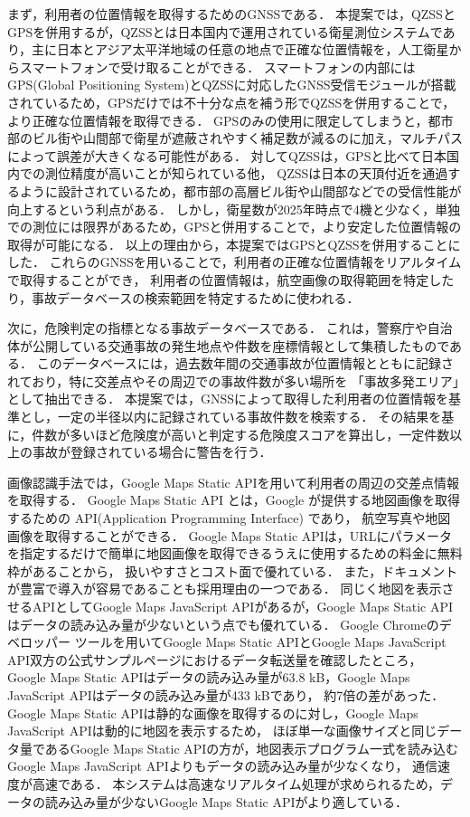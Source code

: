 \documentclass[uplatex,dvipdfmx]{jsarticle}
\begin{document}
まず，利用者の位置情報を取得するためのGNSSである．
本提案では，QZSSとGPSを併用するが，QZSSとは日本国内で運用されている衛星測位システムであり，主に日本とアジア太平洋地域の任意の地点で正確な位置情報を，人工衛星からスマートフォンで受け取ることができる．
スマートフォンの内部にはGPS(Global Positioning System)とQZSSに対応したGNSS受信モジュールが搭載されているため，GPSだけでは不十分な点を補う形でQZSSを併用することで，より正確な位置情報を取得できる．
GPSのみの使用に限定してしまうと，都市部のビル街や山間部で衛星が遮蔽されやすく補足数が減るのに加え，マルチパスによって誤差が大きくなる可能性がある．
対してQZSSは，GPSと比べて日本国内での測位精度が高いことが知られている他，
QZSSは日本の天頂付近を通過するように設計されているため，都市部の高層ビル街や山間部などでの受信性能が向上するという利点がある\cite{ref:qzss}．
しかし，衛星数が2025年時点で4機と少なく，単独での測位には限界があるため，GPSと併用することで，より安定した位置情報の取得が可能になる．
以上の理由から，本提案ではGPSとQZSSを併用することにした．
これらのGNSSを用いることで，利用者の正確な位置情報をリアルタイムで取得することができ，
利用者の位置情報は，航空画像の取得範囲を特定したり，事故データベースの検索範囲を特定するために使われる．

次に，危険判定の指標となる事故データベースである．
これは，警察庁や自治体が公開している交通事故の発生地点や件数を座標情報として集積したものである．
このデータベースには，過去数年間の交通事故が位置情報とともに記録されており，特に交差点やその周辺での事故件数が多い場所を
「事故多発エリア」として抽出できる．
本提案では，GNSSによって取得した利用者の位置情報を基準とし，一定の半径以内に記録されている事故件数を検索する．
その結果を基に，件数が多いほど危険度が高いと判定する危険度スコアを算出し，一定件数以上の事故が登録されている場合に警告を行う．

画像認識手法では，Google Maps Static APIを用いて利用者の周辺の交差点情報を取得する．
Google Maps Static API とは，Google が提供する地図画像を取得するための API(Application Programming Interface) であり，
航空写真や地図画像を取得することができる．
Google Maps Static APIは，URLにパラメータを指定するだけで簡単に地図画像を取得できるうえに使用するための料金に無料枠があることから，
扱いやすさとコスト面で優れている．
また，ドキュメントが豊富で導入が容易であることも採用理由の一つである．
同じく地図を表示させるAPIとしてGoogle Maps JavaScript APIがあるが，Google Maps Static APIはデータの読み込み量が少ないという点でも優れている．
Google Chromeのデベロッパー ツールを用いてGoogle Maps Static APIとGoogle Maps JavaScript API双方の公式サンプルページにおけるデータ転送量を確認したところ，
Google Maps Static APIはデータの読み込み量が63.8 kB，Google Maps JavaScript APIはデータの読み込み量が433 kBであり，
約7倍の差があった\cite{ref:developer_static,ref:developer_js}．Google Maps Static APIは静的な画像を取得するのに対し，Google Maps JavaScript APIは動的に地図を表示するため，
ほぼ単一な画像サイズと同じデータ量であるGoogle Maps Static APIの方が，地図表示プログラム一式を読み込むGoogle Maps JavaScript APIよりもデータの読み込み量が少なくなり，
通信速度が高速である．
本システムは高速なリアルタイム処理が求められるため，データの読み込み量が少ないGoogle Maps Static APIがより適している．
\end{document}
